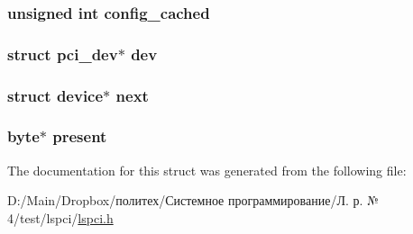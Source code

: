 \subsubsection[{\texorpdfstring{config\+\_\+cached}{config_cached}}]{\setlength{\rightskip}{0pt plus 5cm}unsigned int config\+\_\+cached}\hypertarget{structdevice_a438fad4585f575efbcd5bc2ace1350d4}{}\label{structdevice_a438fad4585f575efbcd5bc2ace1350d4}
\subsubsection[{\texorpdfstring{dev}{dev}}]{\setlength{\rightskip}{0pt plus 5cm}struct pci\+\_\+dev$\ast$ dev}\hypertarget{structdevice_aeb91c60cf706205b37cdd63dc6040761}{}\label{structdevice_aeb91c60cf706205b37cdd63dc6040761}
\subsubsection[{\texorpdfstring{next}{next}}]{\setlength{\rightskip}{0pt plus 5cm}struct {\bf device}$\ast$ next}\hypertarget{structdevice_a37f558b4fc81c233fc9745ffa9fdf856}{}\label{structdevice_a37f558b4fc81c233fc9745ffa9fdf856}
\subsubsection[{\texorpdfstring{present}{present}}]{\setlength{\rightskip}{0pt plus 5cm}byte$\ast$ present}\hypertarget{structdevice_ad3675b50c8eb9d8b46ae2ca476f2b803}{}\label{structdevice_ad3675b50c8eb9d8b46ae2ca476f2b803}


The documentation for this struct was generated from the following file\+:\begin{DoxyCompactItemize}
\item 
D\+:/\+Main/\+Dropbox/политех/Системное программирование/Л. р. № 4/test/lspci/\hyperlink{lspci_8h}{lspci.\+h}\end{DoxyCompactItemize}
